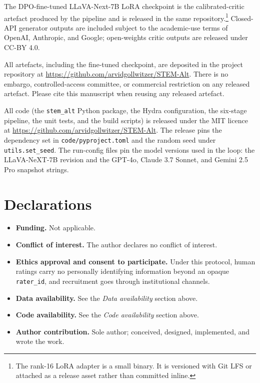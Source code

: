 \documentclass[pdflatex,sn-mathphys-num]{sn-jnl}
\begin{document}
The DPO-fine-tuned LLaVA-Next-7B LoRA checkpoint is the calibrated-critic artefact produced by the pipeline and is released in the same repository.\footnote{The rank-16 LoRA adapter is a small binary. It is versioned with Git LFS or attached as a release asset rather than committed inline.} Closed-API generator outputs are included subject to the academic-use terms of OpenAI, Anthropic, and Google; open-weights critic outputs are released under CC-BY 4.0.

All artefacts, including the fine-tuned checkpoint, are deposited in the project repository at \url{https://github.com/arvidgollwitzer/STEM-Alt}. There is no embargo, controlled-access committee, or commercial restriction on any released artefact. Please cite this manuscript when reusing any released artefact.


All code (the \texttt{stem\_alt} Python package, the Hydra configuration, the six-stage pipeline, the unit tests, and the build scripts) is released under the MIT licence at \url{https://github.com/arvidgollwitzer/STEM-Alt}. The release pins the dependency set in \texttt{code/pyproject.toml} and the random seed under \texttt{utils.set\_seed}. The run-config files pin the model versions used in the loop: the LLaVA-NeXT-7B revision and the GPT-4o, Claude 3.7 Sonnet, and Gemini 2.5 Pro snapshot strings.

\section*{Declarations}

\begin{itemize}
\item \textbf{Funding.} Not applicable.
\item \textbf{Conflict of interest.} The author declares no conflict of interest.
\item \textbf{Ethics approval and consent to participate.} Under this protocol, human ratings carry no personally identifying information beyond an opaque \texttt{rater\_id}, and recruitment goes through institutional channels.
\item \textbf{Data availability.} See the \emph{Data availability} section above.
\item \textbf{Code availability.} See the \emph{Code availability} section above.
\item \textbf{Author contribution.} Sole author; conceived, designed, implemented, and wrote the work.
\end{itemize}
\end{document}
